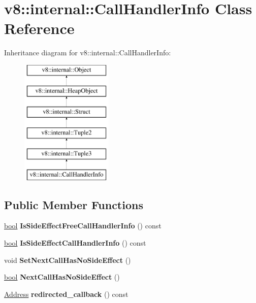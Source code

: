 \hypertarget{classv8_1_1internal_1_1CallHandlerInfo}{}\section{v8\+:\+:internal\+:\+:Call\+Handler\+Info Class Reference}
\label{classv8_1_1internal_1_1CallHandlerInfo}
Inheritance diagram for v8\+:\+:internal\+:\+:Call\+Handler\+Info\+:\begin{figure}[H]
\begin{center}
\leavevmode
\includegraphics[height=6.000000cm]{classv8_1_1internal_1_1CallHandlerInfo}
\end{center}
\end{figure}
\subsection*{Public Member Functions}
\begin{DoxyCompactItemize}
\item 
\mbox{\label{classv8_1_1internal_1_1CallHandlerInfo_ae29a2e2893bdb65bd4995baa093567c1}} 
\mbox{\hyperlink{classbool}{bool}} {\bfseries Is\+Side\+Effect\+Free\+Call\+Handler\+Info} () const
\item 
\mbox{\label{classv8_1_1internal_1_1CallHandlerInfo_aa8d7a629963a0aff2c015c5ac50855b2}} 
\mbox{\hyperlink{classbool}{bool}} {\bfseries Is\+Side\+Effect\+Call\+Handler\+Info} () const
\item 
\mbox{\label{classv8_1_1internal_1_1CallHandlerInfo_abceee71767059a1653ef117e86982719}} 
void {\bfseries Set\+Next\+Call\+Has\+No\+Side\+Effect} ()
\item 
\mbox{\label{classv8_1_1internal_1_1CallHandlerInfo_ad1feb1856708e5adfcaea5ec36fb95bd}} 
\mbox{\hyperlink{classbool}{bool}} {\bfseries Next\+Call\+Has\+No\+Side\+Effect} ()
\item 
\mbox{\label{classv8_1_1internal_1_1CallHandlerInfo_a2b98f686f7fc05f23dd79dd1808d5acb}} 
\mbox{\hyperlink{classuintptr__t}{Address}} {\bfseries redirected\+\_\+callback} () const
\end{DoxyCompactItemize}
